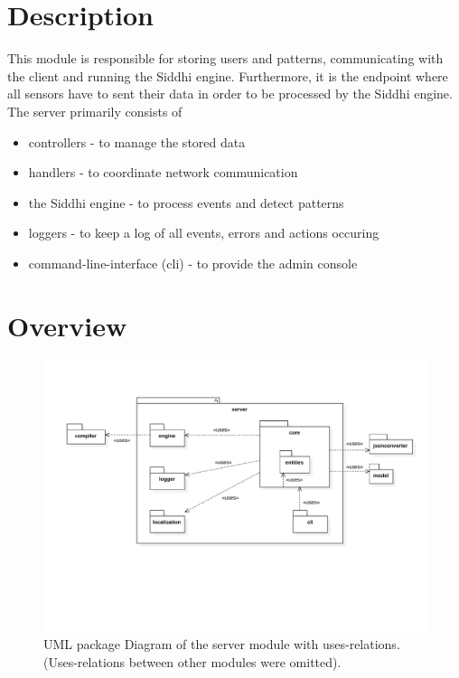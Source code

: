 \section{Description}
This module is responsible for storing users and patterns, communicating with
the client and running the Siddhi engine. Furthermore, it is the endpoint where
all sensors have to sent their data in order to be processed by the Siddhi engine.
The server primarily consists of
\begin{itemize}
    \item controllers - to manage the stored data
    \item handlers - to coordinate network communication
    \item the Siddhi engine - to process events and detect patterns
    \item loggers - to keep a log of all events, errors and actions occuring
    \item command-line-interface (cli) - to provide the admin console
\end{itemize}

\section{Overview}
\FloatBarrier
\begin{figure}
    \centering
    \includegraphics[width=\textwidth]{../module_res/server-package.pdf}
    \caption{UML package Diagram of the server module with uses-relations.
    (Uses-relations between other modules were omitted).
    \label{fig:server-package}}
\end{figure}
\FloatBarrier


